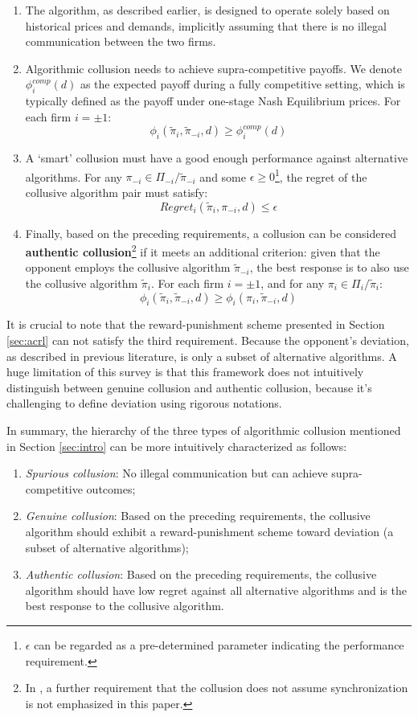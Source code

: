 \documentclass[mnsc,nonblindrev]{workingpaper}
\begin{document}
\begin{enumerate}
    \item The algorithm, as described earlier, is designed to operate solely based on historical prices and demands, implicitly assuming that there is no illegal communication between the two firms.
    \item Algorithmic collusion needs to achieve supra-competitive payoffs. We denote $\phi_i^{comp}(d)$ as the expected payoff during a fully competitive setting, which is typically defined as the payoff under one-stage Nash Equilibrium prices. For each firm $i = \pm 1$:
    \[
        \phi_i(\tilde{\pi}_i, \tilde{\pi}_{-i}, d) \geq \phi_i^{comp}(d)
    \]
    \item A `smart' collusion must have a good enough performance against alternative algorithms. For any $\pi_{-i} \in \Pi_{-i} / \tilde{\pi}_{-i}$ and some $\epsilon \geq 0$\footnote{$\epsilon$ can be regarded as a pre-determined parameter indicating the performance requirement.}, the regret of the collusive algorithm pair must satisfy:
    \[
        Regret_i(\tilde{\pi}_i, \pi_{-i}, d) \leq \epsilon
    \]
    \item Finally, based on the preceding requirements, a collusion can be considered \textbf{authentic collusion}\footnote{In \cite{den2023mathematical}, a further requirement that the collusion does not assume synchronization is not emphasized in this paper.} if it meets an additional criterion: given that the opponent employs the collusive algorithm $\tilde{\pi}_{-i}$, the best response is to also use the collusive algorithm $\tilde{\pi}_i$. For each firm $i = \pm 1$, and for any $\pi_{i} \in \Pi_{i} / \tilde{\pi}_{i}$:
    \[
        \phi_i(\tilde{\pi}_i, \tilde{\pi}_{-i}, d) \geq \phi_i(\pi_i, \tilde{\pi}_{-i}, d)
    \]
\end{enumerate}

It is crucial to note that the reward-punishment scheme presented in Section \ref{sec:acrl} can not satisfy the third requirement. Because the opponent's deviation, as described in previous literature, is only a subset of alternative algorithms. A huge limitation of this survey is that this framework does not intuitively distinguish between genuine collusion and authentic collusion, because it's challenging to define deviation using rigorous notations.

In summary, the hierarchy of the three types of algorithmic collusion mentioned in Section \ref{sec:intro} can be more intuitively characterized as follows:
\begin{enumerate}
    \item \textit{Spurious collusion}: No illegal communication but can achieve supra-competitive outcomes;
    \item \textit{Genuine collusion}: Based on the preceding requirements, the collusive algorithm should exhibit a reward-punishment scheme toward deviation (a subset of alternative algorithms);
    \item \textit{Authentic collusion}: Based on the preceding requirements, the collusive algorithm should have low regret against all alternative algorithms and is the best response to the collusive algorithm.
\end{enumerate}
\end{document}
